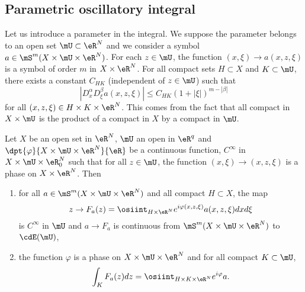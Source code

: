 \subsection{Parametric oscillatory integral}

Let us introduce a parameter in the integral. We suppose the parameter belongs to an open set $\mU\subset\eR^N$ and we consider a symbol $a\in\mS^m(X\times\mU\times\eR^N)$. For each $z\in\mU$, the function $(x,\xi)\to a(x,z,\xi)$ is a symbol of order $m$ in $X\times\eR^N$. For all compact sets $H\subset X$ and $K\subset\mU$, there exists a constant $C_{HK}$ (independent of $z\in\mU$) such that
\begin{equation}
	| D^{\alpha}_xD^{\beta}_{\xi}a(x,z,\xi) |\leq C_{HK}(1+| \xi |)^{m-| \beta |}
\end{equation}
for all $(x,z,\xi)\in H\times K\times\eR^N$. This comes from the fact that all compact in $X\times\mU$ is the product of a compact in $X$ by a compact in $\mU$.


\begin{theorem}
	Let $X$ be an open set in $\eR^N$, $\mU$ an open in $\eR^q$ and $\dpt{\varphi}{X\times\mU\times\eR^N}{\eR}$ be a continuous function, $C^{\infty}$ in $X\times\mU\times\eR^N_0$ such that for all $z\in\mU$, the function $(x,\xi)\to(x,z,\xi)$ is a phase on $X\times\eR^N$. Then

	\begin{enumerate}
		\item for all $a\in\mS^m(X\times\mU\times\eR^N)$ and all compact $H\subset X$, the map
		      \[
			      z\to F_a(z)=\osiint_{H\times\eR^N}e^{i\varphi(x,z,\xi)}a(x,z,\xi)dxd\xi
		      \]
		      is $C^{\infty}$ in $\mU$ and $a\to F_a$ is continuous from $\mS^m(X\times\mU\times\eR^N)$ to $\cdE(\mU)$,

		\item the function $\varphi$ is a phase on $X\times\mU\times\eR^N$ and for all compact $K\subset\mU$,
		      \begin{equation} \label{eq:intKFa}
			      \int_K F_a(z)dz=\osiint_{H\times K\times\eR^N}e^{i\varphi}a.
		      \end{equation}

	\end{enumerate}

\end{theorem}

